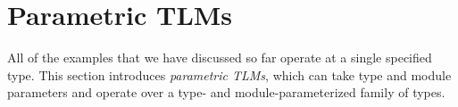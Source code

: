 \documentclass[acmsmall]{acmart}
\begin{document}
\section{Parametric TLMs}
\label{sec:ptsms}

All of the examples that we have discussed so far operate at a single specified type. This section introduces \emph{parametric TLMs}, which can take type and module parameters and operate over a type- and module-parameterized family of types. %
\end{document}
